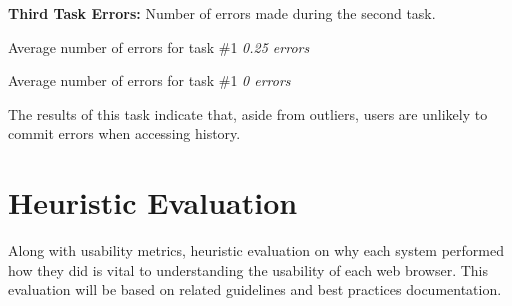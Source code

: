 \documentclass{article}
\begin{document}
\clearpage

\textbf{Third Task Errors: } Number of errors made during the second task.
\begin{center}

\par Average number of errors for task \#1 \textit{0.25 errors}
\par Average number of errors for task \#1 \textit{0 errors}
\end{center}
\par \noindent The results of this task indicate that, aside from outliers, users are unlikely to commit errors when accessing history.

\section{Heuristic Evaluation} Along with usability metrics, heuristic evaluation on why each system performed how they did is vital to understanding the usability of each web browser. This evaluation will be based on related guidelines and best practices documentation.
\end{document}
